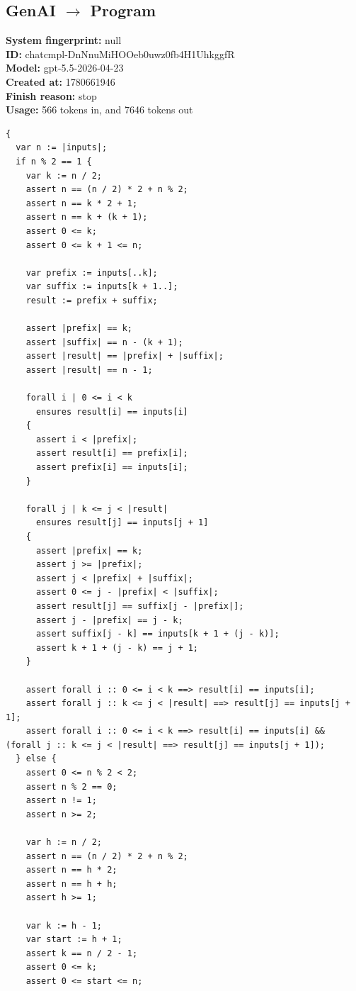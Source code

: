 \documentclass{article}
\begin{document}
\subsection*{GenAI $\rightarrow$ Program}
\textbf{System fingerprint: }null
\\\textbf{ID: }chatcmpl-DnNnuMiHOOeb0uwz0fb4H1UhkggfR
\\\textbf{Model: }gpt-5.5-2026-04-23
\\\textbf{Created at: }1780661946
\\\textbf{Finish reason: }stop
\\\textbf{Usage: }566 tokens in, and 7646 tokens out
\begin{lstlisting}
{
  var n := |inputs|;
  if n % 2 == 1 {
    var k := n / 2;
    assert n == (n / 2) * 2 + n % 2;
    assert n == k * 2 + 1;
    assert n == k + (k + 1);
    assert 0 <= k;
    assert 0 <= k + 1 <= n;

    var prefix := inputs[..k];
    var suffix := inputs[k + 1..];
    result := prefix + suffix;

    assert |prefix| == k;
    assert |suffix| == n - (k + 1);
    assert |result| == |prefix| + |suffix|;
    assert |result| == n - 1;

    forall i | 0 <= i < k
      ensures result[i] == inputs[i]
    {
      assert i < |prefix|;
      assert result[i] == prefix[i];
      assert prefix[i] == inputs[i];
    }

    forall j | k <= j < |result|
      ensures result[j] == inputs[j + 1]
    {
      assert |prefix| == k;
      assert j >= |prefix|;
      assert j < |prefix| + |suffix|;
      assert 0 <= j - |prefix| < |suffix|;
      assert result[j] == suffix[j - |prefix|];
      assert j - |prefix| == j - k;
      assert suffix[j - k] == inputs[k + 1 + (j - k)];
      assert k + 1 + (j - k) == j + 1;
    }

    assert forall i :: 0 <= i < k ==> result[i] == inputs[i];
    assert forall j :: k <= j < |result| ==> result[j] == inputs[j + 1];
    assert forall i :: 0 <= i < k ==> result[i] == inputs[i] && (forall j :: k <= j < |result| ==> result[j] == inputs[j + 1]);
  } else {
    assert 0 <= n % 2 < 2;
    assert n % 2 == 0;
    assert n != 1;
    assert n >= 2;

    var h := n / 2;
    assert n == (n / 2) * 2 + n % 2;
    assert n == h * 2;
    assert n == h + h;
    assert h >= 1;

    var k := h - 1;
    var start := h + 1;
    assert k == n / 2 - 1;
    assert 0 <= k;
    assert 0 <= start <= n;


\end{lstlisting}
\end{document}
